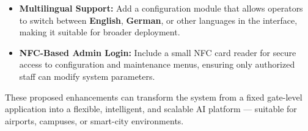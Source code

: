 \begin{itemize}
	\item \textbf{Multilingual Support:}  
	Add a configuration module that allows operators to switch between \textbf{English}, \textbf{German}, or other languages in the interface, making it suitable for broader deployment.
	
	\item \textbf{NFC-Based Admin Login:}  
	Include a small NFC card reader for secure access to configuration and maintenance menus, ensuring only authorized staff can modify system parameters.
\end{itemize}

\vspace{0.3cm}
\noindent
These proposed enhancements can transform the system from a fixed gate-level application into a flexible, intelligent, and scalable AI platform — suitable for airports, campuses, or smart-city environments.


